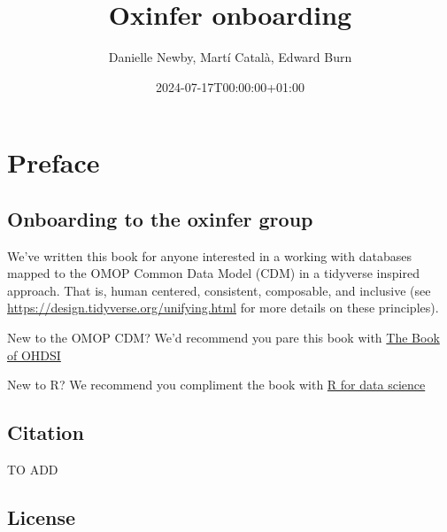 \documentclass[
  letterpaper,
  DIV=11,
  numbers=noendperiod]{scrreprt}
\title{Oxinfer onboarding}
\author{Danielle Newby, Martí Català, Edward Burn}
\date{2024-07-17T00:00:00+01:00}
\renewcommand*\contentsname{Table of contents}
\newcommand\contentsname{Table of contents}
\begin{document}
\maketitle
\ifdefined\Shaded\renewenvironment{Shaded}{\begin{tcolorbox}[borderline west={3pt}{0pt}{shadecolor}, boxrule=0pt, breakable, enhanced, sharp corners, interior hidden, frame hidden]}{\end{tcolorbox}}\fi

\renewcommand*\contentsname{Table of contents}
{
\hypersetup{linkcolor=}
\setcounter{tocdepth}{2}
\tableofcontents
}

\hypertarget{preface}{%
\chapter*{Preface}\label{preface}}

\hypertarget{onboarding-to-the-oxinfer-group}{%
\section*{Onboarding to the oxinfer
group}\label{onboarding-to-the-oxinfer-group}}

We've written this book for anyone interested in a working with
databases mapped to the OMOP Common Data Model (CDM) in a tidyverse
inspired approach. That is, human centered, consistent, composable, and
inclusive (see \url{https://design.tidyverse.org/unifying.html} for more
details on these principles).

New to the OMOP CDM? We'd recommend you pare this book with
\href{https://ohdsi.github.io/TheBookOfOhdsi/}{The Book of OHDSI}

New to R? We recommend you compliment the book with
\href{https://r4ds.had.co.nz/}{R for data science}

\hypertarget{citation}{%
\section*{Citation}\label{citation}}

TO ADD

\hypertarget{license}{%
\section*{License}\label{license}}
\end{document}
